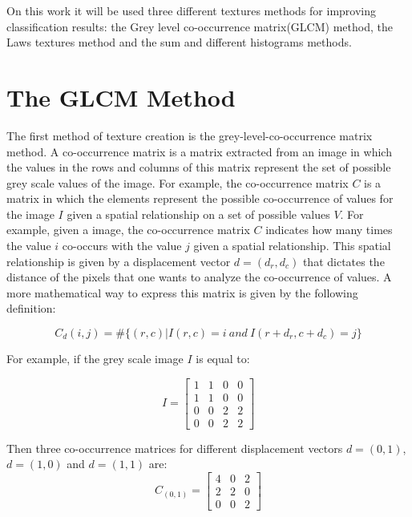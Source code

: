 On this work it will be used three different textures methods for improving classification results: the Grey level co-occurrence matrix(GLCM) method, the Laws textures method and the sum and different histograms methods.

\section{The GLCM Method}
\label{sec:GLCM_Method}

The first method of texture creation is the grey-level-co-occurrence matrix method.
A co-occurrence matrix is a matrix extracted from an image in which the values in the rows and columns of this matrix represent the set of possible grey scale values of the image. 
For example, the co-occurrence matrix $C$ is a matrix in which the elements represent the possible co-occurrence of values for the image $I$ given a spatial relationship on a set of possible values $V$. 
For example, given a image, the co-occurrence matrix $C$ indicates how many times the value $i$ co-occurs with the value $j$ given a spatial relationship. 
This spatial relationship is given by a displacement vector $d = (d_r, d_c)$ that dictates the distance of the pixels that one wants to analyze the co-occurrence of values.
A more mathematical way to express this matrix is given by the following definition:

\begin{equation}
    C_{d}(i,j) = \# \{(r,c) | I(r,c)=i\  \textit{and} \  I(r+d_r, c+d_c)=j \} 
\end{equation}

For example, if the grey scale image $I$ is equal to:

\begin{equation}
I=
    \begin{bmatrix}
    1&1&0&0\\
    1&1&0&0\\
    0&0&2&2\\
    0&0&2&2
    \end{bmatrix} 
\end{equation}{}


Then three co-occurrence matrices for different displacement vectors $d=(0,1)$, $d=(1,0)$ and $d=(1,1)$ are:
\begin{equation}
    C_{(0,1)}=
    \begin{bmatrix}
    4&0&2\\
    2&2&0\\
    0&0&2
    \end{bmatrix}
\end{equation}{}

